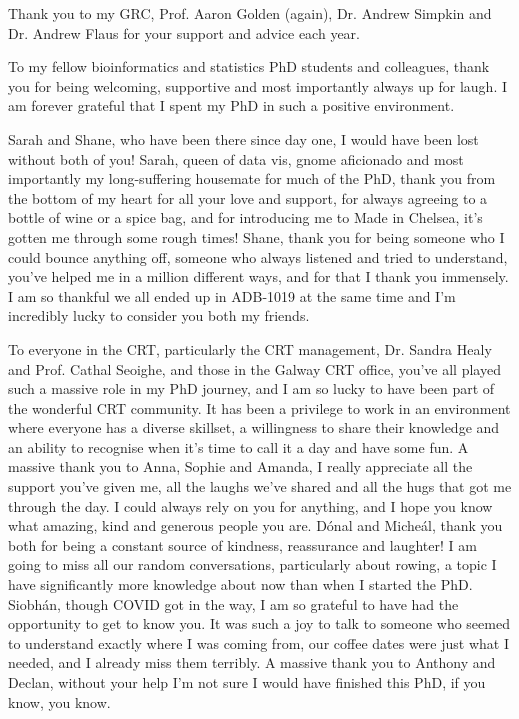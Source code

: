 Thank you to my GRC, Prof. Aaron Golden (again), Dr. Andrew Simpkin and Dr. Andrew Flaus for your support and advice each year.    

To my fellow bioinformatics and statistics PhD students and colleagues, thank you for being welcoming, supportive and most importantly always up for laugh. I am forever grateful that I spent my PhD in such a positive environment.    

Sarah and Shane, who have been there since day one, I would have been lost without both of you! Sarah, queen of data vis, gnome aficionado and most importantly my long-suffering housemate for much of the PhD, thank you from the bottom of my heart for all your love and support, for always agreeing to a bottle of wine or a spice bag, and for introducing me to Made in Chelsea, it’s gotten me through some rough times! Shane, thank you for being someone who I could bounce anything off, someone who always listened and tried to understand, you’ve helped me in a million different ways, and for that I thank you immensely. I am so thankful we all ended up in ADB-1019 at the same time and I'm incredibly lucky to consider you both my friends. 

To everyone in the CRT, particularly the CRT management, Dr. Sandra Healy and Prof. Cathal Seoighe, and those in the Galway CRT office, you’ve all played such a massive role in my PhD journey, and I am so lucky to have been part of the wonderful CRT community. It has been a privilege to work in an environment where everyone has a diverse skillset, a willingness to share their knowledge and an ability to recognise when it’s time to call it a day and have some fun. A massive thank you to Anna, Sophie and Amanda, I really appreciate all the support you’ve given me, all the laughs we’ve shared and all the hugs that got me through the day. I could always rely on you for anything, and I hope you know what amazing, kind and generous people you are. Dónal and Micheál, thank you both for being a constant source of kindness, reassurance and laughter! I am going to miss all our random conversations, particularly about rowing, a topic I have significantly more knowledge about now than when I started the PhD. Siobhán, though COVID got in the way, I am so grateful to have had the opportunity to get to know you. It was such a joy to talk to someone who seemed to understand exactly where I was coming from, our coffee dates were just what I needed, and I already miss them terribly. A massive thank you to Anthony and Declan, without your help I'm not sure I would have finished this PhD, if you know, you know.  

